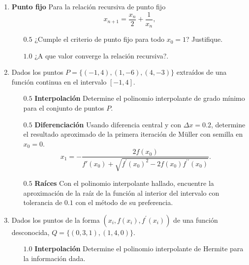 \documentclass[12pt]{article}
\begin{document}
  \begin{enumerate}[leftmargin=*,widest=9]
    \item \textbf{Punto fijo} Para la relación recursiva de punto fijo \[x_{n+1} = \frac{x_n}{2} + \frac{1}{x_n},\]
    \begin{itemize}
    \item[$0.5$] ¿Cumple el criterio de punto fijo para todo $x_0 = 1$? Justifique.
    
    \vspace{3.5cm}
    
    \item[$1.0$] ¿A que valor converge la relación recursiva?.
    
    \vspace{2cm}
    
    \end{itemize}
    
 \item Dados los puntos $P=\lbrace (-1, 4), (1, -6), (4, -3) \rbrace$ extraídos de una función continua en el intervalo $\left[-1, 4\right]$.
    
    \begin{itemize}
    \item[$0.5$] \textbf{Interpolación} Determine el polinomio interpolante de grado mínimo para el conjunto de puntos $P$.
    
    \vspace{5cm}
    
    \item[$0.5$] \textbf{Diferenciación} Usando diferencia central y con $\Delta x = 0.2$, determine el resultado aproximado de la primera iteración de M\"uller con semilla en $x_0=0$.
    \[
    x_1 = -\frac{2f(x_0)}{f\prime(x_0)+\sqrt{f^\prime(x_0)^2 - 2f(x_0)f^{\prime\prime}(x_0)}}.
    \]
    
    \vspace{4cm}
    
    \item[$0.5$] \textbf{Raíces} Con el polinomio interpolante hallado, encuentre la aproximación de la raíz de la función al interior del intervalo con tolerancia de $0.1$ con el método de su preferencia.
    
    \vspace{5cm}
    
    \end{itemize}
    
    \item Dados los puntos de la forma $(x_i, f(x_i), f^\prime (x_i))$ de una función desconocida, $Q=\lbrace (0, 3, 1), (1, 4, 0) \rbrace$.
    \begin{itemize}
    \item[$1.0$] \textbf{Interpolación} Determine el polinomio interpolante de Hermite para la información dada.
    

\end{itemize}
\end{enumerate}
\end{document}
